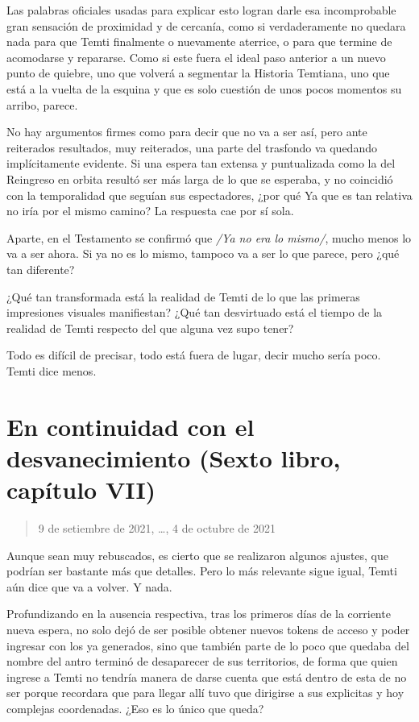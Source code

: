 \documentclass[
  spanish,
]{book}
\begin{document}
Las palabras oficiales usadas para explicar esto logran darle esa incomprobable gran sensación de proximidad y de cercanía, como si verdaderamente no quedara nada para que Temti finalmente o nuevamente aterrice, o para que termine de acomodarse y repararse. Como si este fuera el ideal paso anterior a un nuevo punto de quiebre, uno que volverá a segmentar la Historia Temtiana, uno que está a la vuelta de la esquina y que es solo cuestión de unos pocos momentos su arribo, parece.

No hay argumentos firmes como para decir que no va a ser así, pero ante reiterados resultados, muy reiterados, una parte del trasfondo va quedando implícitamente evidente. Si una espera tan extensa y puntualizada como la del Reingreso en orbita resultó ser más larga de lo que se esperaba, y no coincidió con la temporalidad que seguían sus espectadores, ¿por qué Ya que es tan relativa no iría por el mismo camino? La respuesta cae por sí sola.

Aparte, en el Testamento se confirmó que \emph{/Ya no era lo mismo/}, mucho menos lo va a ser ahora. Si ya no es lo mismo, tampoco va a ser lo que parece, pero ¿qué tan diferente?

¿Qué tan transformada está la realidad de Temti de lo que las primeras impresiones visuales manifiestan? ¿Qué tan desvirtuado está el tiempo de la realidad de Temti respecto del que alguna vez supo tener?

Todo es difícil de precisar, todo está fuera de lugar, decir mucho sería poco. Temti dice menos.

\hypertarget{en-continuidad-con-el-desvanecimiento-sexto-libro-capuxedtulo-vii}{%
\section{En continuidad con el desvanecimiento (Sexto libro, capítulo VII)}\label{en-continuidad-con-el-desvanecimiento-sexto-libro-capuxedtulo-vii}}

\begin{quote}
9 de setiembre de 2021, \ldots, 4 de octubre de 2021
\end{quote}

Aunque sean muy rebuscados, es cierto que se realizaron algunos ajustes, que podrían ser bastante más que detalles. Pero lo más relevante sigue igual, Temti aún dice que va a volver. Y nada.

Profundizando en la ausencia respectiva, tras los primeros días de la corriente nueva espera, no solo dejó de ser posible obtener nuevos tokens de acceso y poder ingresar con los ya generados, sino que también parte de lo poco que quedaba del nombre del antro terminó de desaparecer de sus territorios, de forma que quien ingrese a Temti no tendría manera de darse cuenta que está dentro de esta de no ser porque recordara que para llegar allí tuvo que dirigirse a sus explicitas y hoy complejas coordenadas. ¿Eso es lo único que queda?
\end{document}
